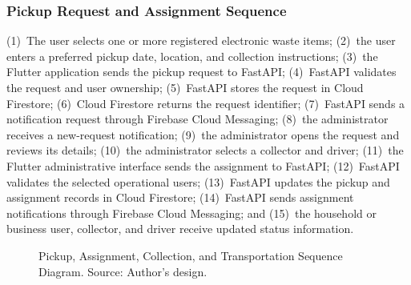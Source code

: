 \subsubsection{Pickup Request and Assignment Sequence}
(1)~The user selects one or more registered electronic waste items; (2)~the
user enters a preferred pickup date, location, and collection instructions;
(3)~the Flutter application sends the pickup request to FastAPI; (4)~FastAPI
validates the request and user ownership; (5)~FastAPI stores the request in
Cloud Firestore; (6)~Cloud Firestore returns the request identifier; (7)~FastAPI
sends a notification request through Firebase Cloud Messaging; (8)~the
administrator receives a new-request notification; (9)~the administrator opens
the request and reviews its details; (10)~the administrator selects a collector
and driver; (11)~the Flutter administrative interface sends the assignment to
FastAPI; (12)~FastAPI validates the selected operational users; (13)~FastAPI
updates the pickup and assignment records in Cloud Firestore; (14)~FastAPI
sends assignment notifications through Firebase Cloud Messaging; and
(15)~the household or business user, collector, and driver receive updated
status information.
\begin{figure}[H]
  \centering
  \caption{Pickup, Assignment, Collection, and Transportation Sequence Diagram. Source: Author's design.}
  \label{fig:seq-pickup}
\end{figure}

